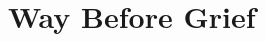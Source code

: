 \documentclass[../../main]{subfiles}
\begin{document}
\section{Way Before Grief} \label{sec:}
\end{document}
